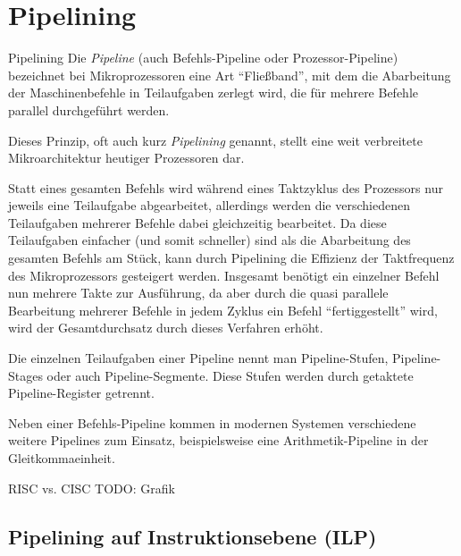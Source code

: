 \section{Pipelining}

\begin{defi}{Pipelining}
    Die \emph{Pipeline} (auch Befehls-Pipeline oder Prozessor-Pipeline) bezeichnet bei Mikroprozessoren eine Art \enquote{Fließband}, mit dem die Abarbeitung der Maschinenbefehle in Teilaufgaben zerlegt wird, die für mehrere Befehle parallel durchgeführt werden.
    
    Dieses Prinzip, oft auch kurz \emph{Pipelining} genannt, stellt eine weit verbreitete Mikroarchitektur heutiger Prozessoren dar.
    
    Statt eines gesamten Befehls wird während eines Taktzyklus des Prozessors nur jeweils eine Teilaufgabe abgearbeitet, allerdings werden die verschiedenen Teilaufgaben mehrerer Befehle dabei gleichzeitig bearbeitet.
    Da diese Teilaufgaben einfacher (und somit schneller) sind als die Abarbeitung des gesamten Befehls am Stück, kann durch Pipelining die Effizienz der Taktfrequenz des Mikroprozessors gesteigert werden.
    Insgesamt benötigt ein einzelner Befehl nun mehrere Takte zur Ausführung, da aber durch die quasi parallele Bearbeitung mehrerer Befehle in jedem Zyklus ein Befehl \enquote{fertiggestellt} wird, wird der Gesamtdurchsatz durch dieses Verfahren erhöht.
    
    Die einzelnen Teilaufgaben einer Pipeline nennt man Pipeline-Stufen, Pipeline-Stages oder auch Pipeline-Segmente.
    Diese Stufen werden durch getaktete Pipeline-Register getrennt.
    
    Neben einer Befehls-Pipeline kommen in modernen Systemen verschiedene weitere Pipelines zum Einsatz, beispielsweise eine Arithmetik-Pipeline in der Gleitkommaeinheit.
\end{defi}

\begin{example}[Pipelining]{RISC vs. CISC}
    TODO: Grafik
\end{example}

\subsection{Pipelining auf Instruktionsebene (ILP)}

